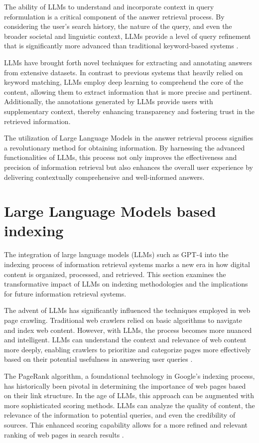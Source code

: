 \documentclass{article}
\begin{document}
The ability of LLMs to understand and incorporate context in query reformulation is a critical component of the answer retrieval process. By considering the user's search history, the nature of the query, and even the broader societal and linguistic context, LLMs provide a level of query refinement that is significantly more advanced than traditional keyword-based systems \citep{schutze2008introduction}.

LLMs have brought forth novel techniques for extracting and annotating answers from extensive datasets. In contrast to previous systems that heavily relied on keyword matching, LLMs employ deep learning to comprehend the core of the content, allowing them to extract information that is more precise and pertinent. Additionally, the annotations generated by LLMs provide users with supplementary context, thereby enhancing transparency and fostering trust in the retrieved information.

The utilization of Large Language Models in the answer retrieval process signifies a revolutionary method for obtaining information. By harnessing the advanced functionalities of LLMs, this process not only improves the effectiveness and precision of information retrieval but also enhances the overall user experience by delivering contextually comprehensive and well-informed answers.


\section{Large Language Models based indexing}

The integration of large language models (LLMs) such as GPT-4 into the indexing process of information retrieval systems marks a new era in how digital content is organized, processed, and retrieved. This section examines the transformative impact of LLMs on indexing methodologies and the implications for future information retrieval systems.

The advent of LLMs has significantly influenced the techniques employed in web page crawling. Traditional web crawlers relied on basic algorithms to navigate and index web content. However, with LLMs, the process becomes more nuanced and intelligent. LLMs can understand the context and relevance of web content more deeply, enabling crawlers to prioritize and categorize pages more effectively based on their potential usefulness in answering user queries \citep{brown2020language}.

The PageRank algorithm, a foundational technology in Google's indexing process, has historically been pivotal in determining the importance of web pages based on their link structure. In the age of LLMs, this approach can be augmented with more sophisticated scoring methods. LLMs can analyze the quality of content, the relevance of the information to potential queries, and even the credibility of sources. This enhanced scoring capability allows for a more refined and relevant ranking of web pages in search results \citep{brin1998anatomy}.
\end{document}
